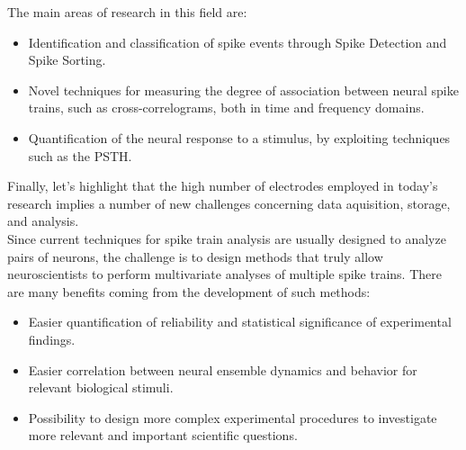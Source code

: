 The main areas of research in this field are:
\begin{itemize}
      \item Identification and classification of spike events through Spike
            Detection and Spike Sorting.
      \item Novel techniques for measuring the degree of association between neural spike trains,
            such as cross-correlograms, both in time and frequency domains.
      \item Quantification of the neural response to a stimulus, by exploiting
            techniques such as the PSTH.
\end{itemize}
Finally, let's highlight that the high number of electrodes employed in
today's research implies a number of new challenges concerning data
aquisition, storage, and analysis.\\
Since current techniques for spike train analysis are usually designed to
analyze pairs of neurons, the challenge is to design methods
that truly allow neuroscientists to perform multivariate analyses of
multiple spike trains.
There are many benefits coming from the development of such methods:
\begin{itemize}
      \item Easier quantification of reliability and statistical
            significance of experimental findings.
      \item Easier correlation between neural ensemble dynamics and behavior
            for relevant biological stimuli.
      \item Possibility to design more complex experimental procedures to
            investigate more relevant and important scientific questions.
\end{itemize}

